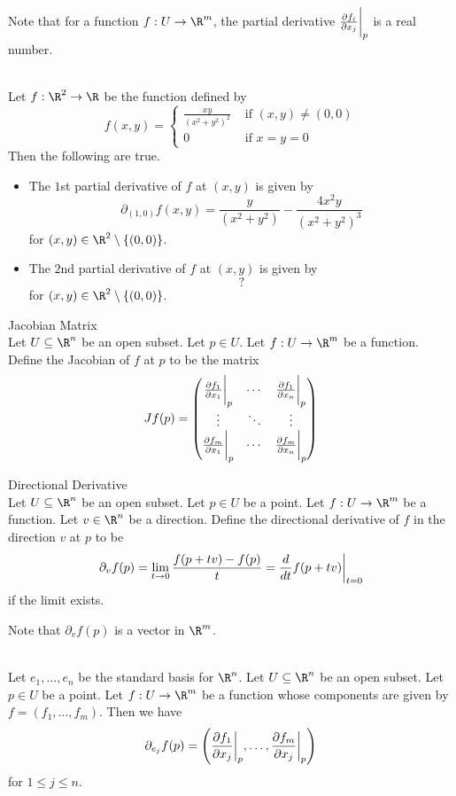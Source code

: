 \documentclass[a4paper]{article}
\begin{document}
Note that for a function $f:U\to\R^m$, the partial derivative $\frac{\partial f_i}{\partial x_j}\bigg{|}_p$ is a real number. 

\begin{eg}{}{}\\
Let $f:\R^2\to\R$ be the function defined by $$f(x,y)=\begin{cases}
\frac{xy}{(x^2+y^2)^2} & \text{ if }(x,y)\neq(0,0)\\
0 & \text{ if }x=y=0
\end{cases}$$
Then the following are true. 
\begin{itemize}
\item The $1$st partial derivative of $f$ at $(x,y)$ is given by $$\partial_{(1,0)}f(x,y)=\frac{y}{(x^2+y^2)}-\frac{4x^2y}{(x^2+y^2)^3}$$ for $(x,y)\in\R^2\setminus\{(0,0)\}$. 
\item The $2$nd partial derivative of $f$ at $(x,y)$ is given by $$\text{?}$$ for $(x,y)\in\R^2\setminus\{(0,0)\}$. 
\end{itemize}
\end{eg}

\begin{defn}{Jacobian Matrix}{}\\
Let $U\subseteq\R^n$ be an open subset. Let $p\in U$. Let $f:U\to\R^m$ be a function. Define the Jacobian of $f$ at $p$ to be the matrix $$Jf(p)=\begin{pmatrix}
\frac{\partial f_1}{\partial x_1}\bigg{|}_p & \cdots & \frac{\partial f_1}{\partial x_n}\bigg{|}_p\\
\vdots & \ddots & \vdots\\
\frac{\partial f_m}{\partial x_1}\bigg{|}_p & \cdots & \frac{\partial f_m}{\partial x_n}\bigg{|}_p
\end{pmatrix}$$
\end{defn}

\begin{defn}{Directional Derivative}{}\\
Let $U\subseteq\R^n$ be an open subset. Let $p\in U$ be a point. Let $f:U\to\R^m$ be a function. Let $v\in\R^n$ be a direction. Define the directional derivative of $f$ in the direction $v$ at $p$ to be $$\partial_vf(p)=\lim_{t\to 0}\frac{f(p+tv)-f(p)}{t}=\frac{d}{dt}f(p+tv)\bigg{|}_{t=0}$$ if the limit exists. 
\end{defn}

Note that $\partial_vf(p)$ is a vector in $\R^m$. 

\begin{lmm}{}{}\\
Let $e_1,\dots,e_n$ be the standard basis for $\R^n$. Let $U\subseteq\R^n$ be an open subset. Let $p\in U$ be a point. Let $f:U\to\R^m$ be a function whose components are given by $f=(f_1,\dots,f_m)$. Then we have $$\partial_{e_j}f(p)=\left(\frac{\partial f_1}{\partial x_j}\bigg{|}_p,\dots,\frac{\partial f_m}{\partial x_j}\bigg{|}_p\right)$$ for $1\leq j\leq n$. 
\end{lmm}
\end{document}
